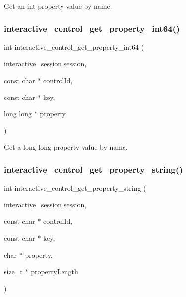 Get an {\ttfamily int} property value by name. 

\mbox{\label{group___interactivity_ga86a32e27120b233fa435818f470b533f}} 
\subsubsection{\texorpdfstring{interactive\+\_\+control\+\_\+get\+\_\+property\+\_\+int64()}{interactive\_control\_get\_property\_int64()}}
{\footnotesize\ttfamily int interactive\+\_\+control\+\_\+get\+\_\+property\+\_\+int64 (\begin{DoxyParamCaption}\item[{\mbox{\hyperlink{group___interactivity_ga6d8819d38b8dc8994a2299cf22a65a31}{interactive\+\_\+session}}}]{session,  }\item[{const char $\ast$}]{control\+Id,  }\item[{const char $\ast$}]{key,  }\item[{long long $\ast$}]{property }\end{DoxyParamCaption})}



Get a {\ttfamily long long} property value by name. 

\mbox{\label{group___interactivity_gae13de2f8b4329a0e891d43b015e91d92}} 
\subsubsection{\texorpdfstring{interactive\+\_\+control\+\_\+get\+\_\+property\+\_\+string()}{interactive\_control\_get\_property\_string()}}
{\footnotesize\ttfamily int interactive\+\_\+control\+\_\+get\+\_\+property\+\_\+string (\begin{DoxyParamCaption}\item[{\mbox{\hyperlink{group___interactivity_ga6d8819d38b8dc8994a2299cf22a65a31}{interactive\+\_\+session}}}]{session,  }\item[{const char $\ast$}]{control\+Id,  }\item[{const char $\ast$}]{key,  }\item[{char $\ast$}]{property,  }\item[{size\+\_\+t $\ast$}]{property\+Length }\end{DoxyParamCaption})}



